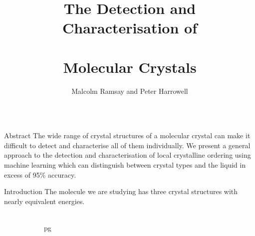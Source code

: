 \documentclass[]{beamer}
\title{The Detection and Characterisation of \\\ \vspace{0.4em}\\ Molecular Crystals}
\author{Malcolm Ramsay and Peter Harrowell}
\institute{School of Chemistry, The University of Sydney}
\begin{document}
\begin{frame}[t]{}
  \begin{columns}[t]

    \begin{column}{0.45\linewidth}

      \begin{block}{Abstract}
        The wide range of crystal structures of a molecular crystal can make it difficult to detect and
        characterise all of them individually. We present a general approach to the detection and
        characterisation of local crystalline ordering using machine learning which can distinguish
        between crystal types and the liquid in excess of 95\% accuracy.
      \end{block}

      \begin{block}{Introduction}
        The molecule we are studying has three crystal structures with nearly equivalent energies.
        \begin{figure}[h]
          \centering
          \begin{subfigure}[t]{0.3\linewidth}
              \includegraphics[width=\linewidth]{trimer-crys-pg}
            \caption{pg}
            \label{fig:crystals pg}
          \end{subfigure}
          \begin{subfigure}[t]{0.3\linewidth}

\end{subfigure}
\end{figure}
\end{block}
\end{column}
\end{columns}
\end{frame}
\end{document}

